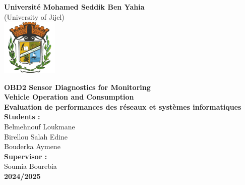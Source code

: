 \documentclass[12pt,a4paper]{report}
\begin{document}
\begin{titlepage}
    \begin{center}
        \vspace*{1cm}

        {\LARGE \textbf{Universit\'e Mohamed Seddik Ben Yahia}} \\[0.5cm]
        (University of Jijel)\\[0.5cm]

        
        \includegraphics[width=0.2\textwidth]{Logo.png}

        \vspace{1.5cm}

        {\Huge \textbf{OBD2 Sensor Diagnostics for Monitoring \\ Vehicle Operation and Consumption}} \\[1.5cm]

        {\Large \textbf{Evaluation de performances des r\'eseaux et syst\`emes informatiques}} \\[1.5cm]

        {\Large \textbf{Students :}} \\[0.5cm]
        {\Large Belmehnouf Loukmane} \\[0.2cm]
        {\Large Birellou Salah Edine} \\[0.2cm]
        {\Large Bouderka Aymene} \\[1.5cm]

        {\Large \textbf{Supervisor :}} \\[0.5cm]
        {\Large Soumia Bourebia} \\[1.5cm]
        
        {\Large \textbf{2024/2025}}

    \end{center}
\end{titlepage}

\newpage
\thispagestyle{empty}
\mbox{}
\newpage

\thispagestyle{empty}
\tableofcontents
{}
\end{document}
